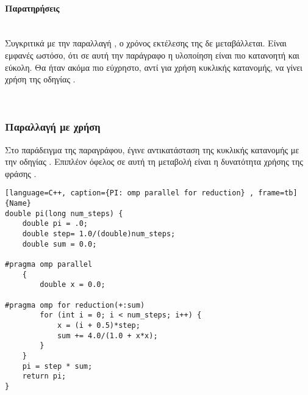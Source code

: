 \paragraph{Παρατηρήσεις}
\ \\
Συγκριτικά με την παραλλαγή , ο χρόνος εκτέλεσης της  δε μεταβάλλεται. Είναι εμφανές ωστόσο, ότι σε αυτή την παράγραφο η υλοποίηση είναι πιο κατανοητή και εύκολη. Θα ήταν ακόμα πιο εύχρηστο, αντί για χρήση κυκλικής κατανομής, να γίνει χρήση της οδηγίας .

\ \\
\subsubsection{Παραλλαγή με χρήση }
Στο παράδειγμα της παραγράφου, έγινε αντικατάσταση της κυκλικής κατανομής με την οδηγίας . Επιπλέον όφελος σε αυτή τη μεταβολή είναι η δυνατότητα χρήσης της φράσης .

\begin{spacing}{0.6}
\begin{lstlisting}[language=C++, caption={PI: omp parallel for reduction} , frame=tb]{Name}
double pi(long num_steps) {
    double pi = .0;
    double step= 1.0/(double)num_steps;
    double sum = 0.0;

#pragma omp parallel
    {
        double x = 0.0;

#pragma omp for reduction(+:sum)
        for (int i = 0; i < num_steps; i++) {
            x = (i + 0.5)*step;
            sum += 4.0/(1.0 + x*x);
        }
    }
    pi = step * sum;
    return pi;
}
\end{lstlisting}
\end{spacing}

